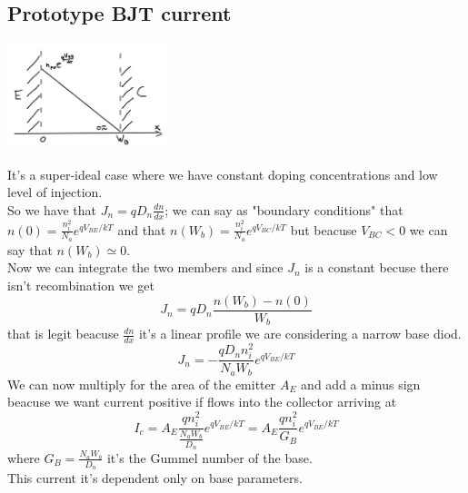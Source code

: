 \subsection{Prototype BJT current}

\centering
\includegraphics[width=0.35\textwidth]{bjt4.png}\\
\raggedright

It's a super-ideal case where we have constant doping concentrations and low level of injection.\\
So we have that $J_n=qD_n \frac{dn}{dx}$; we can say as "boundary conditions" that $n(0)=\frac{n_i^2}{N_a}e^{qV_{BE}/kT}$ and that $n(W_b)=\frac{n_i^2}{N_a}e^{qV_{BC}/kT}$ but beacuse $V_{BC}<0$ we can say that $n(W_b)\simeq 0$.\\
Now we can integrate the two members and since $J_n$ is a constant becuse there isn't recombination we get
\begin{equation}
J_n=qD_n\frac{n(W_b)-n(0)}{W_b}
\end{equation}
that is legit beacuse $\frac{dn}{dx}$ it's a linear profile we are considering a narrow base diod.\\
\begin{equation}
J_n=-\frac{qD_nn_i^2}{N_aW_b}e^{qV_{BE}/kT}
\end{equation}
We can now multiply for the area of the emitter $A_E$ and add a minus sign beacuse we want current positive if flows into the collector arriving at
\begin{equation}
I_c=A_E\frac{qn_i^2}{\frac{N_aW_b}{D_n}}e^{qV_{BE}/kT}=A_E\frac{qn_i^2}{G_B}e^{qV_{BE}/kT}
\end{equation}
where $G_B=\frac{N_aW_b}{D_n}$ it's the Gummel number of the base.\\
This current it's dependent only on base parameters.

